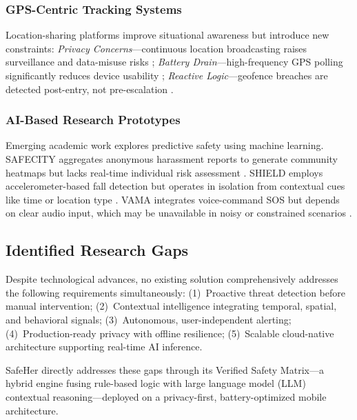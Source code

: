 \subsubsection{GPS-Centric Tracking Systems}
Location-sharing platforms improve situational awareness but introduce new constraints: \textit{Privacy Concerns}---continuous location broadcasting raises surveillance and data-misuse risks \cite{gupta2023}; \textit{Battery Drain}---high-frequency GPS polling significantly reduces device usability \cite{nguyen2023}; \textit{Reactive Logic}---geofence breaches are detected post-entry, not pre-escalation \cite{gemini2025}.

\subsubsection{AI-Based Research Prototypes}
Emerging academic work explores predictive safety using machine learning. SAFECITY aggregates anonymous harassment reports to generate community heatmaps but lacks real-time individual risk assessment \cite{chen2024}. SHIELD employs accelerometer-based fall detection but operates in isolation from contextual cues like time or location type \cite{gupta2023}. VAMA integrates voice-command SOS but depends on clear audio input, which may be unavailable in noisy or constrained scenarios \cite{park2023}.

\subsection{Identified Research Gaps}
Despite technological advances, no existing solution comprehensively addresses the following requirements simultaneously: (1)~Proactive threat detection before manual intervention; (2)~Contextual intelligence integrating temporal, spatial, and behavioral signals; (3)~Autonomous, user-independent alerting; (4)~Production-ready privacy with offline resilience; (5)~Scalable cloud-native architecture supporting real-time AI inference.

SafeHer directly addresses these gaps through its Verified Safety Matrix---a hybrid engine fusing rule-based logic with large language model (LLM) contextual reasoning---deployed on a privacy-first, battery-optimized mobile architecture.
